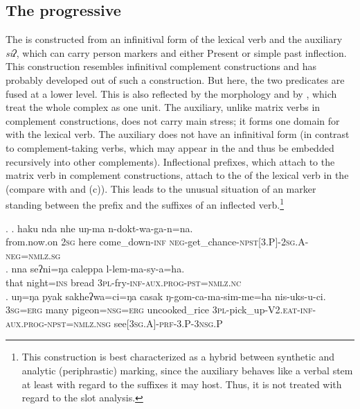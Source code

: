 		
\subsection{The  progressive}\label{progressive}

The   is constructed from an infinitival form of the lexical verb and the auxiliary \emph{siʔ}, which can carry person markers and  either Present or  simple past inflection. This construction resembles infinitival complement constructions and has probably developed out of such a construction. But here, the two predicates are fused at a lower level. This is also reflected by the morphology and by , which treat the whole complex as one unit. The auxiliary, unlike matrix verbs in complement constructions, does not carry main stress; it forms one domain for  with the lexical verb. The auxiliary does not have an infinitival form (in contrast to complement-taking verbs, which may appear in the  and thus be embedded recursively into other complements). Inflectional prefixes, which attach to the matrix verb in complement constructions, attach to the  of the lexical verb in the  (compare \Next[a] with \Next[b] and (c)). This leads to the unusual situation of an  marker standing between the prefix and the suffixes of an inflected verb.\footnote{This construction is best characterized as a hybrid between synthetic and analytic (periphrastic) marking, since the auxiliary behaves like a verbal stem at least with regard to the suffixes it may host. Thus, it is not treated with regard to the slot analysis.} 


\ex. \ag. haku nda nhe uŋ-ma n-dokt-wa-ga-n=na.\\
		from.now.on {\scshape 2sg} here come\_down{\scshape -inf} {\scshape neg-}get\_chance{\scshape -npst[3.P]-2sg.A-neg=nmlz.sg}	\\
	 
 	\bg. nna  seʔni=ŋa       caleppa l-lem-ma-sy-a=ha.\\ 
		that night{\scshape =ins} bread {\scshape 3pl-}fry{\scshape -inf-aux.prog-pst=nmlz.nc}\\
	  
	\bg. uŋ=ŋa   pyak sakheʔwa=ci=ŋa     casak ŋ-gom-ca-ma-sim-me=ha nis-uks-u-ci.\\
 {\scshape 3sg=erg} many  pigeon{\scshape =nsg=erg} uncooked\_rice  {\scshape 3pl}-pick\_up{\scshape -V2.eat-inf-aux.prog-npst=nmlz.nsg} see{\scshape [3sg.A]-prf-3.P-3nsg.P}\\
 



